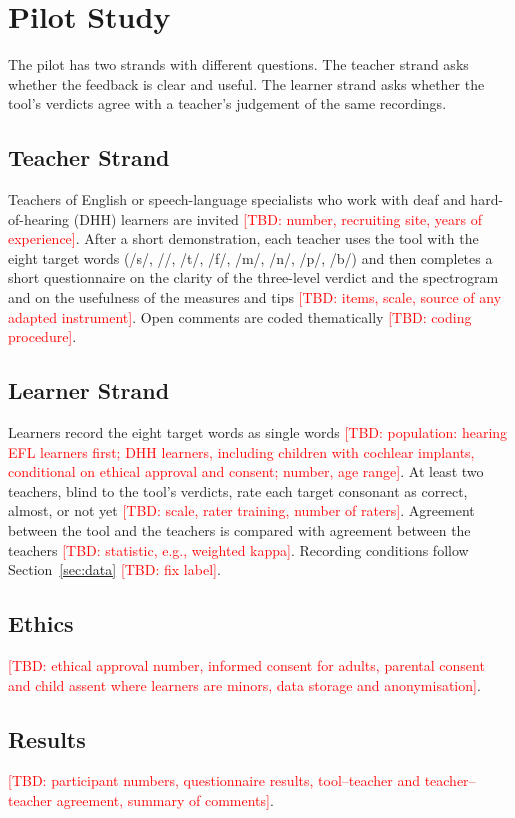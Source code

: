 \documentclass[conference]{IEEEtran}
\newcommand{\tbd}[1]{\textcolor{red}{[TBD: #1]}}
\newcommand{\ipa}[1]{/#1/}
\begin{document}
\section{Pilot Study}

The pilot has two strands with different questions. The teacher strand asks
whether the feedback is clear and useful. The learner strand asks whether the
tool's verdicts agree with a teacher's judgement of the same recordings.

\subsection{Teacher Strand}
Teachers of English or speech-language specialists who work with deaf and
hard-of-hearing (DHH) learners are invited \tbd{number, recruiting site,
years of experience}. After a short demonstration, each teacher uses the
tool with the eight target words (/s/, \ipa{\textesh}, \ipa{t\textesh}, /f/, /m/, /n/, /p/, /b/)
 and then completes a short questionnaire on the
clarity of the three-level verdict and the spectrogram and on the usefulness
of the measures and tips \tbd{items, scale, source of any adapted
instrument}. Open comments are coded thematically \tbd{coding procedure}.

\subsection{Learner Strand}
Learners record the eight target words as single words
\tbd{population: hearing EFL learners first; DHH learners, including children
with cochlear implants, conditional on ethical approval and consent;
number, age range}. At least two teachers, blind to the tool's verdicts,
rate each target consonant as correct, almost, or not yet
\tbd{scale, rater training, number of raters}. Agreement between the tool and
the teachers is compared with agreement between the teachers
\tbd{statistic, e.g., weighted kappa}. Recording conditions follow
Section~\ref{sec:data} \tbd{fix label}.

\subsection{Ethics}
\tbd{ethical approval number, informed consent for adults, parental consent
and child assent where learners are minors, data storage and anonymisation}.

\subsection{Results}
\tbd{participant numbers, questionnaire results, tool--teacher and
teacher--teacher agreement, summary of comments}.
\end{document}
